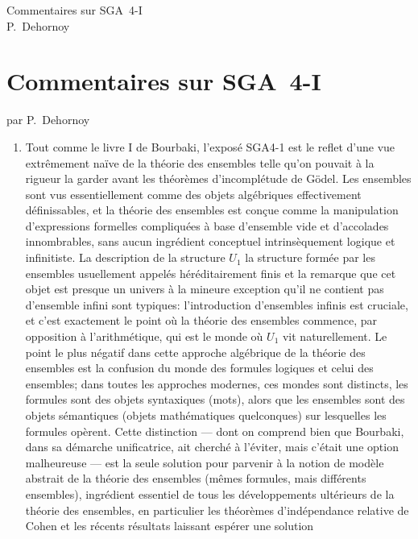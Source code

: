 \documentclass[10pt]{fichiers-configuration-latex/smfart}
\begin{document}
\begin{center}
Commentaires sur SGA~4-I\\
P. Dehornoy
\end{center}


\else
\chapter{Commentaires sur SGA~4-I}
\begin{center}
par P. Dehornoy
\end{center}
\fi

\begin{enumerate}
\item Tout comme le livre I de Bourbaki, l'exposé SGA4-1 est le
reflet d'une vue extrêmement naïve de la théorie des
ensembles telle qu'on pouvait à la rigueur la garder avant
les théorèmes d'incomplétude de Gödel. Les ensembles sont
vus essentiellement comme des objets algébriques
effectivement définissables, et la théorie des ensembles est
conçue comme la manipulation d'expressions formelles
compliquées à base d'ensemble vide et d'accolades
innombrables, sans aucun ingrédient conceptuel
intrinsèquement logique et infinitiste. La description de la
structure $U_1$ la structure formée par les ensembles
usuellement appelés héréditairement finis et la remarque que
cet objet est presque un univers à la mineure exception
qu'il ne contient pas d'ensemble infini sont typiques:
l'introduction d'ensembles infinis est cruciale, et c'est
exactement le point où la théorie des ensembles commence,
par opposition à l'arithmétique, qui est le monde où $U_1$
vit naturellement. Le point le plus négatif dans cette
approche algébrique de la théorie des ensembles est la
confusion du monde des formules logiques et celui des
ensembles; dans toutes les approches modernes, ces mondes
sont distincts, les formules sont des objets syntaxiques
(mots), alors que les ensembles sont des objets sémantiques
(objets mathématiques quelconques) sur lesquelles les
formules opèrent. Cette distinction --- dont on comprend
bien que Bourbaki, dans sa démarche unificatrice, ait
cherché à l'éviter, mais c'était une option malheureuse ---
est la seule solution pour parvenir à la notion de modèle
abstrait de la théorie des ensembles (mêmes formules, mais
différents ensembles), ingrédient essentiel de tous les
développements ultérieurs de la théorie des ensembles, en
particulier les théorèmes d'indépendance relative de Cohen
et les récents résultats laissant espérer une solution

\end{enumerate}
\end{document}
